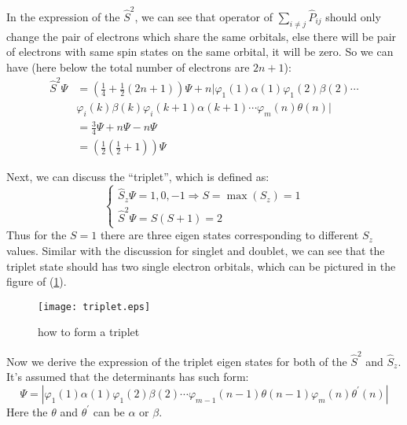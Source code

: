 In the expression of the $\hat{S}^{2}$, we can see that operator of
$\sum_{i \neq j}\hat{P}_{ij}$ should only change the pair of
electrons which share the same orbitals, else there will be pair of
electrons with same spin states on the same orbital, it will be
zero. So we can have (here below the total number of electrons are
$2n+1$):
\begin{equation}\label{}
\begin{split}
\hat{S}^{2}\Psi &= \left(\frac{1}{4} + \frac{1}{2}(2n +
1)\right)\Psi + n|\varphi_{1}(1)\alpha(1)\varphi_{1}(2)\beta(2)
\cdots  \\
&\varphi_{i}(k)\beta(k)\varphi_{i}(k+1)\alpha(k+1)\cdots
\varphi_{m}(n)\theta(n)| \\
&=\frac{3}{4}\Psi + n\Psi -n\Psi \\
&=\left(\frac{1}{2}(\frac{1}{2} + 1)\right)\Psi
\end{split}
\end{equation}

Next, we can discuss the ``triplet'', which is defined as:
\begin{equation}\label{SICeq:7}
\left\{
  \begin{array}{ll}
    \hat{S}_{z}\Psi = 1, 0,  -1
    \Rightarrow S = \max(S_{z}) = 1\\
    \hat{S}^{2}\Psi = S(S+1) = 2
  \end{array}
\right.
\end{equation}
Thus for the $S=1$ there are three eigen states corresponding to
different $S_{z}$ values. Similar with the discussion for singlet
and doublet, we can see that the triplet state should has two single
electron orbitals, which can be pictured in the figure of
(\ref{SIC3}).
\begin{figure}
\begin{center}
\texttt{[image: triplet.eps]}
\caption{how to form a triplet} \label{SIC3}
\end{center}
\end{figure}

Now we derive the expression of the triplet eigen states for both of
the $\hat{S}^{2}$ and $\hat{S}_{z}$. It's assumed that the
determinants has such form:
\begin{equation}\label{}
\Psi = |\varphi_{1}(1)\alpha(1)\varphi_{1}(2)\beta(2) \cdots
\varphi_{m-1}(n-1)\theta(n-1) \varphi_{m}(n)\theta^{'}(n)|
\end{equation}
Here the $\theta$ and $\theta^{'}$ can be $\alpha$ or $\beta$.

